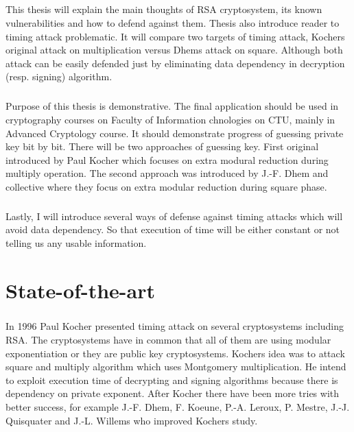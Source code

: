 \documentclass[thesis=B,english]{FITthesis}[2012/10/20]
\begin{document}
\paragraph*{}
{This thesis will explain the main thoughts of RSA cryptosystem, its known vulnerabilities and how to defend against them. Thesis also introduce reader to timing attack problematic.
It will compare two targets of timing attack, Kochers original attack on multiplication versus Dhems attack on square. Although both attack can be easily defended just by eliminating
data dependency in decryption (resp. signing) algorithm.

\paragraph*{}
{
Purpose of this thesis is demonstrative. The final application should be used in cryptography courses on Faculty of Information chnologies on CTU, mainly in Advanced Cryptology course. It should demonstrate progress of guessing private key bit by bit. There will be two approaches of guessing key. First original introduced by Paul Kocher which focuses on extra modural reduction during multiply operation\cite{Kocher1996}. The second approach was introduced by J.-F. Dhem and collective where they focus on extra modular reduction during square phase\cite{Dhem}.
}

\paragraph*{}{
Lastly, I will introduce several ways of defense against timing attacks which will avoid data dependency. So that execution of time will be either constant or not telling us any usable information.
}



\pagestyle{ruled}
\chapter{State-of-the-art}
\paragraph*{}{
In 1996 Paul Kocher presented timing attack on several cryptosystems including RSA\cite{Kocher1996}. The cryptosystems have in common that all of them are using modular exponentiation or they are public key cryptosystems. Kochers idea was to attack square and multiply algorithm which uses Montgomery multiplication. He intend to exploit execution time of decrypting and signing algorithms because there is dependency on private exponent. After Kocher there have been more tries with better success, for example J.-F. Dhem, F. Koeune, P.-A. Leroux, P. Mestre, J.-J. Quisquater and J.-L. Willems who improved Kochers study\cite{Dhem}.}


}
\end{document}

